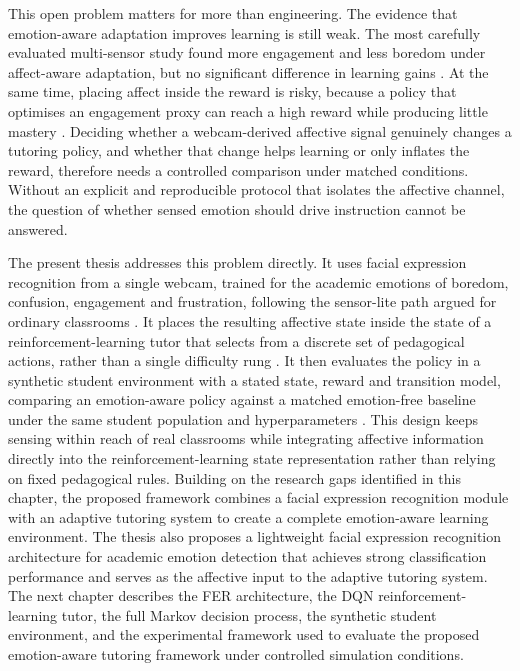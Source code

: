This open problem matters for more than engineering. The evidence that emotion-aware adaptation improves learning is still weak. The most carefully evaluated multi-sensor study found more engagement and less boredom under affect-aware adaptation, but no significant difference in learning gains \cite{standen_evaluation_2020}. At the same time, placing affect inside the reward is risky, because a policy that optimises an engagement proxy can reach a high reward while producing little mastery \cite{olukola_pedagogical_2026}. Deciding whether a webcam-derived affective signal genuinely changes a tutoring policy, and whether that change helps learning or only inflates the reward, therefore needs a controlled comparison under matched conditions. Without an explicit and reproducible protocol that isolates the affective channel, the question of whether sensed emotion should drive instruction cannot be answered.

The present thesis addresses this problem directly. It uses facial expression recognition from a single webcam, trained for the academic emotions of boredom, confusion, engagement and frustration, following the sensor-lite path argued for ordinary classrooms \cite{petrovica_emotion_2016,lek_academic_2023}. It places the resulting affective state inside the state of a reinforcement-learning tutor that selects from a discrete set of pedagogical actions, rather than a single difficulty rung \cite{azoulay_adaptive_2021,fu_integrating_2025}. It then evaluates the policy in a synthetic student environment with a stated state, reward and transition model, comparing an emotion-aware policy against a matched emotion-free baseline under the same student population and hyperparameters \cite{sanz_ausin_leveraging_2019,olukola_pedagogical_2026,weitekamp_tutorgym_2025}. This design keeps sensing within reach of real classrooms while integrating affective information directly into the reinforcement-learning state representation rather than relying on fixed pedagogical rules. Building on the research gaps identified in this chapter, the proposed framework combines a facial expression recognition module with an adaptive tutoring system to create a complete emotion-aware learning environment. The thesis also proposes a lightweight facial expression recognition architecture for academic emotion detection that achieves strong classification performance and serves as the affective input to the adaptive tutoring system. The next chapter describes the \ac{FER} architecture, the \ac{DQN} reinforcement-learning tutor, the full Markov decision process, the synthetic student environment, and the experimental framework used to evaluate the proposed emotion-aware tutoring framework under controlled simulation conditions.

